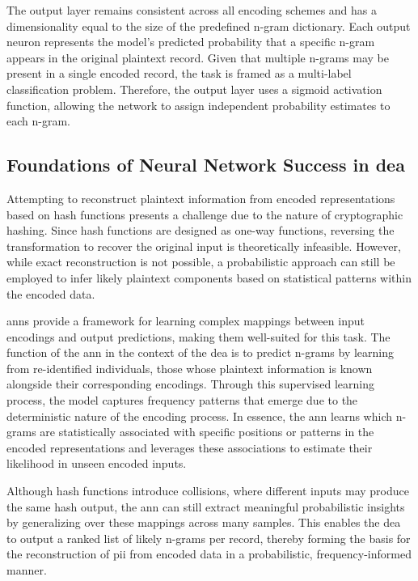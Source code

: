 The output layer remains consistent across all encoding schemes and has a dimensionality equal to the size of the predefined n-gram dictionary.
Each output neuron represents the model's predicted probability that a specific n-gram appears in the original plaintext record.
Given that multiple n-grams may be present in a single encoded record, the task is framed as a multi-label classification problem.
Therefore, the output layer uses a sigmoid activation function, allowing the network to assign independent probability estimates to each n-gram.

\subsection{Foundations of Neural Network Success in \ac{dea}}

Attempting to reconstruct plaintext information from encoded representations based on hash functions presents a challenge due to the nature of cryptographic hashing.
Since hash functions are designed as one-way functions, reversing the transformation to recover the original input is theoretically infeasible.
However, while exact reconstruction is not possible, a probabilistic approach can still be employed to infer likely plaintext components based on statistical patterns within the encoded data.

\ac{ann}s provide a framework for learning complex mappings between input encodings and output predictions, making them well-suited for this task.
The function of the \ac{ann} in the context of the \ac{dea} is to predict n-grams by learning from re-identified individuals, those whose plaintext information is known alongside their corresponding encodings.
Through this supervised learning process, the model captures frequency patterns that emerge due to the deterministic nature of the encoding process.
In essence, the \ac{ann} learns which n-grams are statistically associated with specific positions or patterns in the encoded representations and leverages these associations to estimate their likelihood in unseen encoded inputs.

Although hash functions introduce collisions, where different inputs may produce the same hash output, the \ac{ann} can still extract meaningful probabilistic insights by generalizing over these mappings across many samples.
This enables the \ac{dea} to output a ranked list of likely n-grams per record, thereby forming the basis for the reconstruction of \ac{pii} from encoded data in a probabilistic, frequency-informed manner.

